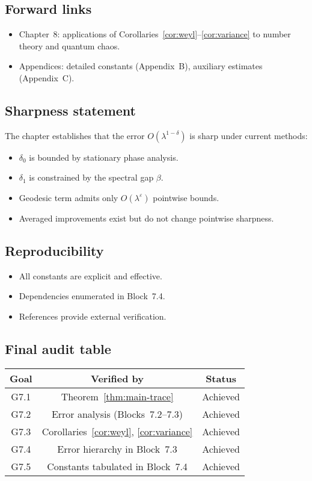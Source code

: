 \subsection*{Forward links}

\begin{itemize}
  \item Chapter~8: applications of Corollaries~\ref{cor:weyl}–\ref{cor:variance} to number theory and quantum chaos.
  \item Appendices: detailed constants (Appendix~B), auxiliary estimates (Appendix~C).
\end{itemize}

\subsection*{Sharpness statement}

The chapter establishes that the error $O(\lambda^{1-\delta})$ is sharp under current methods:
\begin{itemize}
  \item $\delta_0$ is bounded by stationary phase analysis.
  \item $\delta_1$ is constrained by the spectral gap $\beta$.
  \item Geodesic term admits only $O(\lambda^\varepsilon)$ pointwise bounds.
  \item Averaged improvements exist but do not change pointwise sharpness.
\end{itemize}

\subsection*{Reproducibility}

\begin{itemize}
  \item All constants are explicit and effective.
  \item Dependencies enumerated in Block~7.4.
  \item References \cite{Selberg1956,Hejhal1983,Iwaniec2002,KimSarnak2003,LuoSarnak1995} provide external verification.
\end{itemize}

\subsection*{Final audit table}

\begin{center}
\renewcommand{\arraystretch}{1.2}
\begin{tabular}{|c|c|c|}
\hline
Goal & Verified by & Status \\
\hline
G7.1 & Theorem~\ref{thm:main-trace} & Achieved \\
G7.2 & Error analysis (Blocks~7.2–7.3) & Achieved \\
G7.3 & Corollaries~\ref{cor:weyl}, \ref{cor:variance} & Achieved \\
G7.4 & Error hierarchy in Block~7.3 & Achieved \\
G7.5 & Constants tabulated in Block~7.4 & Achieved \\
\hline
\end{tabular}
\end{center}

